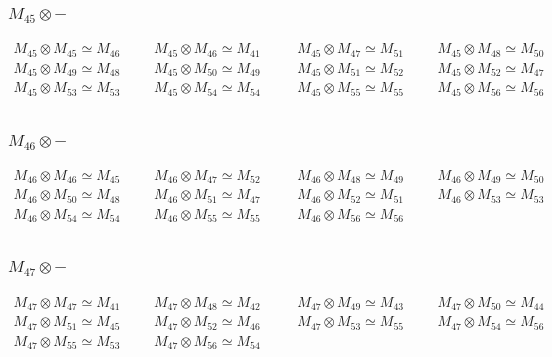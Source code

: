 \subsubsection{$M_45\otimes -$}
\begin{align*}
M_{45} \otimes M_{45} \simeq M_{46} &&& M_{45} \otimes M_{46} \simeq M_{41} &&\
& M_{45} \otimes M_{47} \simeq M_{51} &&& M_{45} \otimes M_{48} \simeq M_{50}\
\\
M_{45} \otimes M_{49} \simeq M_{48} &&& M_{45} \otimes M_{50} \simeq M_{49} &&\
& M_{45} \otimes M_{51} \simeq M_{52} &&& M_{45} \otimes M_{52} \simeq M_{47}\
\\
M_{45} \otimes M_{53} \simeq M_{53} &&& M_{45} \otimes M_{54} \simeq M_{54} &&\
& M_{45} \otimes M_{55} \simeq M_{55} &&& M_{45} \otimes M_{56} \simeq M_{56}\
\\
\end{align*}

\subsubsection{$M_46\otimes -$}
\begin{align*}
M_{46} \otimes M_{46} \simeq M_{45} &&& M_{46} \otimes M_{47} \simeq M_{52} &&\
& M_{46} \otimes M_{48} \simeq M_{49} &&& M_{46} \otimes M_{49} \simeq M_{50}\
\\
M_{46} \otimes M_{50} \simeq M_{48} &&& M_{46} \otimes M_{51} \simeq M_{47} &&\
& M_{46} \otimes M_{52} \simeq M_{51} &&& M_{46} \otimes M_{53} \simeq M_{53}\
\\
M_{46} \otimes M_{54} \simeq M_{54} &&& M_{46} \otimes M_{55} \simeq M_{55} &&\
& M_{46} \otimes M_{56} \simeq M_{56}\\
\end{align*}

\subsubsection{$M_47\otimes -$}
\begin{align*}
M_{47} \otimes M_{47} \simeq M_{41} &&& M_{47} \otimes M_{48} \simeq M_{42} &&\
& M_{47} \otimes M_{49} \simeq M_{43} &&& M_{47} \otimes M_{50} \simeq M_{44}\
\\
M_{47} \otimes M_{51} \simeq M_{45} &&& M_{47} \otimes M_{52} \simeq M_{46} &&\
& M_{47} \otimes M_{53} \simeq M_{55} &&& M_{47} \otimes M_{54} \simeq M_{56}\
\\
M_{47} \otimes M_{55} \simeq M_{53} &&& M_{47} \otimes M_{56} \simeq M_{54}\\
\end{align*}

